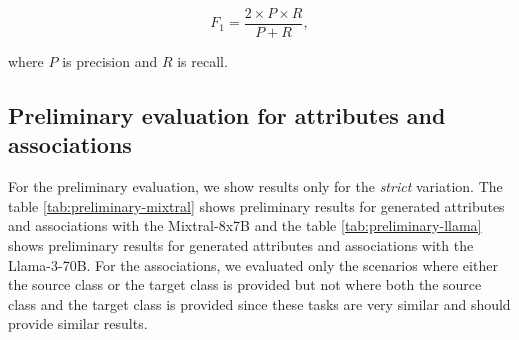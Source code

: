 \[ F_{1} = \dfrac{2 \times P \times R}{P + R}, \]

\noindent where $P$ is precision and $R$ is recall.


\subsection{Preliminary evaluation for attributes and associations}
\label{sec:preliminary_attributes_associations}

For the preliminary evaluation, we show results only for the \textit{strict} variation. The table \ref{tab:preliminary-mixtral} shows preliminary results for generated attributes and associations with the Mixtral-8x7B and the table \ref{tab:preliminary-llama} shows preliminary results for generated attributes and associations with the Llama-3-70B. For the associations, we evaluated only the scenarios where either the source class or the target class is provided but not where both the source class and the target class is provided since these tasks are very similar and should provide similar results.

